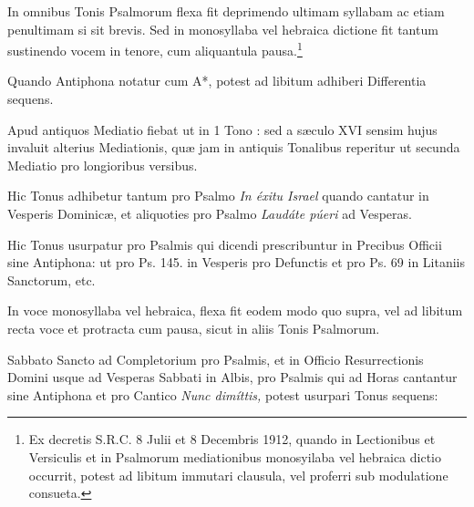 \documentclass[vesperale_romanum.tex]{subfiles}
\begin{document}


In omnibus Tonis Psalmorum flexa fit deprimendo ultimam syllabam ac etiam penultimam si sit brevis. Sed in monosyllaba vel hebraica dictione fit tantum sustinendo vocem in tenore, cum aliquantula pausa.\footnote{Ex decretis S.R.C. 8 Julii et 8 Decembris 1912, quando in Lectionibus et Versiculis et in Psalmorum mediationibus monosyilaba vel hebraica dictio occurrit, potest ad libitum immutari clausula, vel proferri sub modulatione consueta.}



Quando Antiphona notatur cum A*, potest ad libitum adhiberi Differentia sequens.


Apud antiquos Mediatio fiebat ut in 1 Tono : sed a sæculo XVI sensim hujus invaluit alterius Mediationis, quæ jam in antiquis Tonalibus reperitur ut secunda Mediatio pro longioribus versibus.


Hic Tonus adhibetur tantum pro Psalmo \textit{In éxitu Israel} quando cantatur in Vesperis Dominicæ, et aliquoties pro Psalmo \textit{Laudáte púeri} ad Vesperas.




Hic Tonus usurpatur pro Psalmis qui dicendi prescribuntur in Precibus Officii sine Antiphona: ut pro Ps. 145. in Vesperis pro Defunctis et pro Ps. 69 in Litaniis Sanctorum, etc.


In voce monosyllaba vel hebraica, flexa fit eodem modo quo supra, vel ad libitum recta voce et protracta cum pausa, sicut in aliis Tonis Psalmorum.

Sabbato Sancto ad Completorium pro Psalmis, et in Officio Resurrectionis Domini usque ad Vesperas Sabbati in Albis, pro Psalmis qui ad Horas cantantur sine Antiphona et pro Cantico \textit{Nunc dimíttis,} potest usurpari Tonus sequens:
\end{document}
